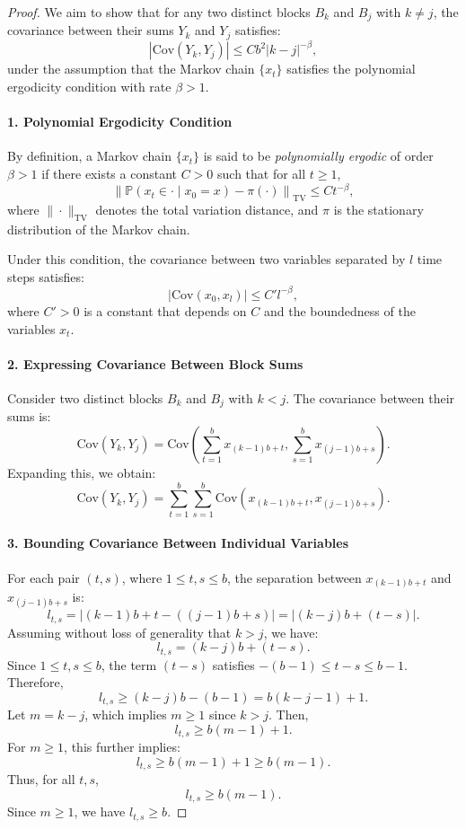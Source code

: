 \begin{proof}
\;\newline

We aim to show that for any two distinct blocks \(B_k\) and \(B_j\) with \(k \neq j\), the covariance between their sums \(Y_k\) and \(Y_j\) satisfies:
\[
|\text{Cov}(Y_k, Y_j)| \leq C b^2 |k - j|^{-\beta},
\]
under the assumption that the Markov chain \(\{x_t\}\) satisfies the polynomial ergodicity condition with rate \(\beta > 1\).

\paragraph{1. Polynomial Ergodicity Condition}

By definition, a Markov chain \(\{x_t\}\) is said to be \emph{polynomially ergodic} of order \(\beta > 1\) if there exists a constant \(C > 0\) such that for all \(t \geq 1\),
\[
\left\| \mathbb{P}(x_{t} \in \cdot \mid x_0 = x) - \pi(\cdot) \right\|_{\text{TV}} \leq C t^{-\beta},
\]
where \(\|\cdot\|_{\text{TV}}\) denotes the total variation distance, and \(\pi\) is the stationary distribution of the Markov chain.

Under this condition, the covariance between two variables separated by \(l\) time steps satisfies:
\[
|\text{Cov}(x_0, x_l)| \leq C' l^{-\beta},
\]
where \(C' > 0\) is a constant that depends on \(C\) and the boundedness of the variables \(x_t\).

\paragraph{2. Expressing Covariance Between Block Sums}

Consider two distinct blocks \(B_k\) and \(B_j\) with \(k < j\). The covariance between their sums is:
\[
\text{Cov}(Y_k, Y_j) = \text{Cov}\left(\sum_{t=1}^{b} x_{(k-1)b + t}, \sum_{s=1}^{b} x_{(j-1)b + s}\right).
\]
Expanding this, we obtain:
\[
\text{Cov}(Y_k, Y_j) = \sum_{t=1}^{b} \sum_{s=1}^{b} \text{Cov}(x_{(k-1)b + t}, x_{(j-1)b + s}).
\]

\paragraph{3. Bounding Covariance Between Individual Variables}

For each pair \((t, s)\), where \(1 \leq t, s \leq b\), the separation between \(x_{(k-1)b + t}\) and \(x_{(j-1)b + s}\) is:
\[
l_{t,s} = |(k-1)b + t - ((j-1)b + s)| = |(k - j)b + (t - s)|.
\]
Assuming without loss of generality that \(k > j\), we have:
\[
l_{t,s} = (k - j)b + (t - s).
\]
Since \(1 \leq t, s \leq b\), the term \((t - s)\) satisfies \(- (b - 1) \leq t - s \leq b - 1\). Therefore,
\[
l_{t,s} \geq (k - j)b - (b - 1) = b(k - j - 1) + 1.
\]
Let \(m = k - j\), which implies \(m \geq 1\) since \(k > j\). Then,
\[
l_{t,s} \geq b(m - 1) + 1.
\]
For \(m \geq 1\), this further implies:
\[
l_{t,s} \geq b(m - 1) + 1 \geq b(m - 1).
\]
Thus, for all \(t, s\),
\[
l_{t,s} \geq b(m - 1).
\]
Since \(m \geq 1\), we have \(l_{t,s} \geq b\).


\end{proof}

